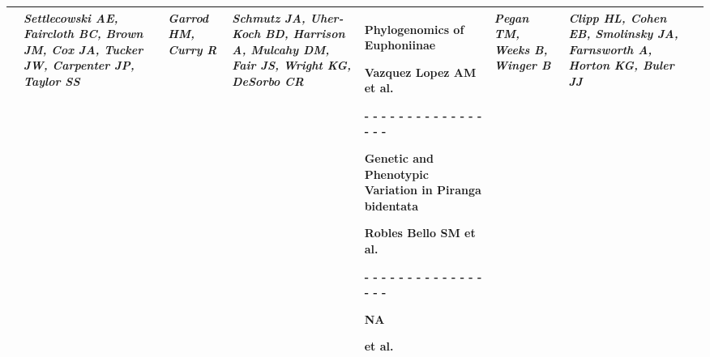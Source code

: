 \begin{tabular}{|x{0.8cm}|x{2.65cm}|x{2.65cm}|a{2.65cm}|x{2.65cm}|x{2.65cm}|x{2.65cm}|@{}m{0pt}@{}}
& \par \vspace{8pt} \textit{Settlecowski AE, Faircloth BC, Brown JM, Cox JA, Tucker JW, Carpenter JP, Taylor SS} &  \par \vspace{8pt} \textit{Garrod HM, Curry R} &  \par \vspace{8pt} \textit{Schmutz JA, Uher-Koch BD, Harrison A, Mulcahy DM, Fair JS, Wright KG, DeSorbo CR} & \scriptsize Phylogenomics of Euphoniinae\par \tiny Vazquez Lopez AM et al. \par - - - - - - - - - - - - - - - - - \par \vspace{2pt} \scriptsize Genetic and Phenotypic Variation in Piranga bidentata\par \tiny Robles Bello SM et al. \par - - - - - - - - - - - - - - - - - \par \vspace{2pt} \scriptsize NA\par \tiny  et al.  &  \par \vspace{8pt} \textit{Pegan TM, Weeks B, Winger B} &  \par \vspace{8pt} \textit{Clipp HL, Cohen EB, Smolinsky JA, Farnsworth A, Horton KG, Buler JJ}&\\[25ex]
\hline

\end{tabular}

